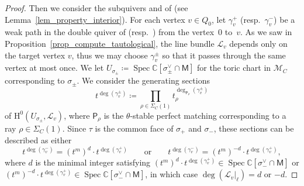 \documentclass[pdftex]{sigma}
\numberwithin{equation}{section}
\theoremstyle{definition}
\newcommand{\CC}{\mathbb{C}}
\newcommand{\calL}{\mathcal{L}}
\newcommand{\calM}{\mathcal{M}}
\newcommand{\rmH}{\mathrm{H}}
\newcommand{\sfM}{\mathsf{M}}
\newcommand{\sfP}{\mathsf{P}}
\newcommand{\Spec}{\operatorname{Spec}}
\begin{document}
\begin{proof}
Then we consider the subquivers  and  of  (see Lemma~\ref{lem_property_interior}).
For each vertex $v\in Q_0$, let $\gamma_v^+$ (resp.\ $\gamma_v^-$) be a weak path in the double quiver of  (resp.\ )
from the vertex~$0$ to~$v$.
As we saw in Proposition~\ref{prop_compute_tautological}, the line bundle $\calL_v$ depends only on the target vertex $v$,
thus we may choose $\gamma_v^\pm$ so that it passes through the same vertex at most once.
We let $U_{\sigma_{\pm}}\coloneqq \Spec\CC[\sigma_{\pm}^\vee\cap \sfM]$ for the toric chart in $\calM_C$ corresponding to $\sigma_{\pm}$.
We consider the generating sections
\[
t^{\deg(\gamma^\pm_v)}\coloneqq\prod_{\rho\in\Sigma_C(1)}t_\rho^{\deg_{\sfP_\rho}(\gamma^\pm_v)}
\]
of $\rmH^0(U_{\sigma_\pm}, \calL_v)$, where $\sfP_\rho$ is the $\theta$-stable perfect matching corresponding to a ray $\rho\in\Sigma_C(1)$.
Since $\tau$ is the common face of $\sigma_+$ and $\sigma_-$, these sections can be described as either
\begin{equation}
\label{eq_degree_linebdl}
t^{\deg(\gamma^-_v)}=(t^m)^d\cdot t^{\deg(\gamma^+_v)}\qquad \text{or} \qquad t^{\deg(\gamma^-_v)}=(t^m)^{-d}\cdot t^{\deg(\gamma^+_v)},
\end{equation}
where $d$ is the minimal integer satisfying $(t^m)^{d}\cdot t^{\deg(\gamma^+_v)}\in \Spec\CC[\sigma_{-}^\vee\cap \sfM]$ or
$(t^m)^{-d}\cdot t^{\deg(\gamma^+_v)}\in \Spec\CC[\sigma_{-}^\vee\cap \sfM]$,
in which case $\deg(\calL_v |_\ell)=d$ or $-d$.


\end{proof}
\end{document}
